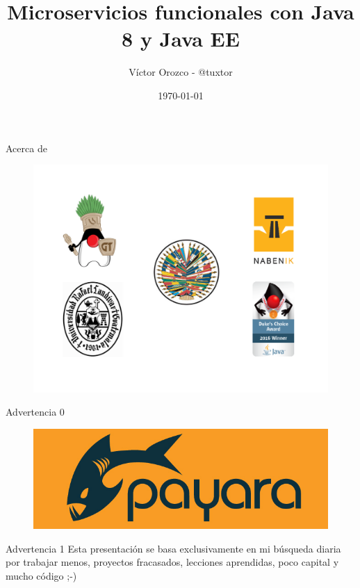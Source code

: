 \documentclass{beamer}
\title{Microservicios funcionales con Java 8 y Java EE}
\author{Víctor Orozco - @tuxtor}
\institute{Java Cloud Day Mexico 2017}
\date{\today}
\begin{document}
\frame{\titlepage}

\begin{frame}{Acerca de}
\begin{figure}
	\centering
	\includegraphics[width=\linewidth]{Images/fescudos}
\end{figure}
\end{frame}

\begin{frame}{Advertencia 0}
\begin{figure}
	\centering
	\includegraphics[width=\linewidth]{Images/payara}
\end{figure}
\end{frame}

\begin{frame}{Advertencia 1}
\huge Esta presentación se basa exclusivamente en mi búsqueda diaria por trabajar menos, proyectos fracasados, lecciones aprendidas, poco capital y mucho código ;-)
\end{frame}
\end{document}
